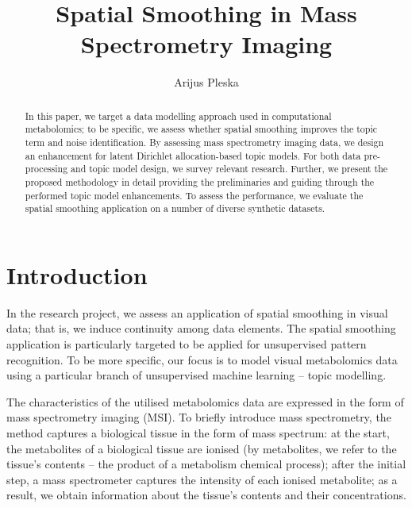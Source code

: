 \documentclass{mpaper}
\begin{document}
\title{Spatial Smoothing in Mass Spectrometry Imaging}
\author{Arijus Pleska}

\maketitle



\begin{abstract}
In this paper, we target a data modelling approach used in computational metabolomics; to be specific, we assess whether spatial smoothing improves the topic term and noise identification. By assessing mass spectrometry imaging data, we design an enhancement for latent Dirichlet allocation-based topic models. For both data pre-processing and topic model design, we survey relevant research. Further, we present the proposed methodology in detail providing the preliminaries and guiding through the performed topic model enhancements. To assess the performance, we evaluate the spatial smoothing application on a number of diverse synthetic datasets.
\end{abstract}


\section{Introduction}

\par In the research project, we assess an application of spatial smoothing in visual data; that is, we induce continuity among data elements. The spatial smoothing application is particularly targeted to be applied for unsupervised pattern recognition. To be more specific, our focus is to model visual metabolomics data using a particular branch of unsupervised machine learning -- topic modelling.  

\par The characteristics of the utilised metabolomics data are expressed in the form of mass spectrometry imaging (MSI). To briefly introduce mass spectrometry, the method captures a biological tissue in the form of mass spectrum: at the start, the metabolites of a biological tissue are ionised (by metabolites, we refer to the tissue's contents -- the product of a metabolism chemical process); after the initial step, a mass spectrometer captures the intensity of each ionised metabolite; as a result, we obtain information about the tissue's contents and their concentrations. 
\end{document}
